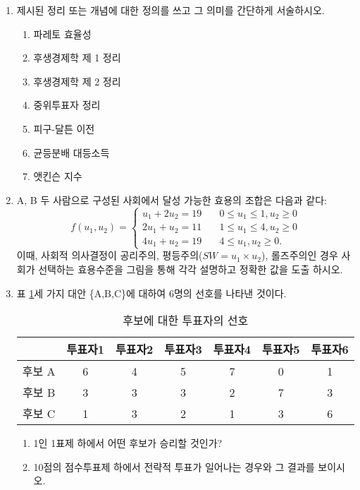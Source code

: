 \documentclass{article}
\begin{document}
\begin{enumerate}[{\bf 문제 \arabic*.}]
    \item 제시된 정리 또는 개념에 대한 정의를 쓰고 그 의미를 간단하게 서술하시오.
    \begin{enumerate}
        \item 파레토 효율성
        \item 후생경제학 제 1 정리
        \item 후생경제학 제 2 정리
        \item 중위투표자 정리
        \item 피구-달튼 이전
        \item 균등분배 대등소득
        \item 앳킨슨 지수
    \end{enumerate}
    
    \item A, B 두 사람으로 구성된 사회에서 달성 가능한 효용의 조합은 다음과 같다:
    \[   
    f(u_1,u_2) = 
         \begin{cases}
           u_1 + 2u_2 = 19 &\quad 0 \leq u_1 \leq 1 , u_2 \geq 0 \\
           2u_1 + u_2 = 11 &\quad 1 \leq u_1 \leq 4 , u_2 \geq 0 \\
           4u_1 + u_2 = 19 &\quad 4 \leq u_1  , u_2 \geq 0. 
         \end{cases}
    \]
    이때, 사회적 의사결정이 공리주의, 평등주의($SW=u_1 \times u_2$), 롤즈주의인 경우 사회가 선택하는 효용수준을 그림을 통해 각각 설명하고 정확한 값을 도출 하시오.
    
    \item 표 \ref{tab:scov}\는 세 가지 대안 \{A,B,C\}에 대하여 6명의 선호를 나타낸 것이다. 
        \begin{table}[htbp]
            \centering
            \begin{tabular}{c|c|c|c|c|c|c}
                \toprule
                              & 투표자1 & 투표자2 & 투표자3 & 투표자4 & 투표자5 & 투표자6 \\
                \hline 후보 A & 6 & 4 & 5 & 7 & 0 & 1 \\
                       후보 B & 3 & 3 & 3 & 2 & 7 & 3 \\
                       후보 C & 1 & 3 & 2 & 1 & 3 & 6 \\
                \bottomrule
            \end{tabular}
            \caption{후보에 대한 투표자의 선호}
            \label{tab:scov}
        \end{table}
        \begin{enumerate}
            \item 1인 1표제 하에서 어떤 후보가 승리할 것인가?
            \item 10점의 점수투표제 하에서 전략적 투표가 일어나는 경우와 그 결과를 보이시오.
        \end{enumerate}
        

\end{enumerate}
\end{document}
